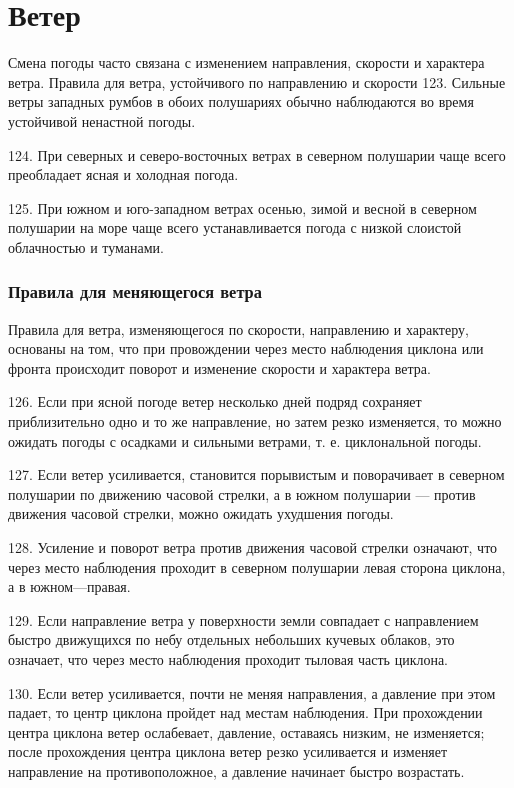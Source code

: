 \section{Ветер}

Смена погоды часто связана с изменением направления, скорости и характера ветра.
Правила для ветра, устойчивого по направлению и скорости
123. Сильные ветры западных румбов в обоих полушариях обычно наблюдаются во время устойчивой ненастной погоды.

124. При северных и северо-восточных ветрах в северном полушарии чаще всего преобладает ясная и холодная погода.

125. При южном и юго-западном ветрах осенью, зимой и весной в северном полушарии на море чаще всего устанавливается погода с низкой слоистой облачностью и туманами.

\subsubsection{Правила для меняющегося ветра}

Правила для ветра, изменяющегося по скорости, направлению и характеру, основаны на том, что при провождении через место наблюдения циклона или фронта происходит поворот и изменение скорости и характера ветра.

126. Если при ясной погоде ветер несколько дней подряд сохраняет приблизительно одно и то же направление, но затем резко изменяется, то можно ожидать погоды с осадками и сильными ветрами, т. е. циклональной погоды.

127. Если ветер усиливается, становится порывистым и поворачивает в северном полушарии по движению часовой стрелки, а в южном полушарии — против движения часовой стрелки, можно ожидать ухудшения погоды.

128. Усиление и поворот ветра против движения часовой стрелки означают, что через место наблюдения проходит в северном полушарии левая сторона циклона, а в южном—правая.

129. Если направление ветра у поверхности земли совпадает с направлением быстро движущихся по небу отдельных небольших кучевых облаков, это означает, что через место наблюдения проходит тыловая часть циклона.

130. Если ветер усиливается, почти не меняя направления, а давление при этом падает, то центр циклона пройдет над местам наблюдения. При прохождении центра циклона ветер ослабевает, давление, оставаясь низким, не изменяется; после прохождения центра циклона ветер резко усиливается и изменяет направление на противоположное, а давление начинает быстро возрастать.

